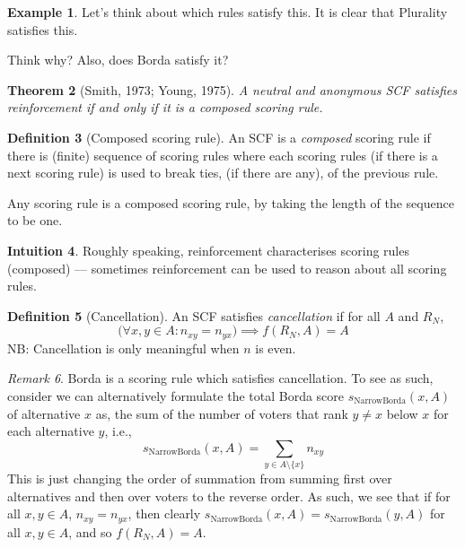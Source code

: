 \documentclass{book}
\newcommand{\unclear}[1]{%
  \par\noindent
  \colorbox{yellow!30}{#1}\par
}
\theoremstyle{plain}
\newtheorem{theorem}{Theorem}[subsection]
\theoremstyle{definition}
\newtheorem{definition}[theorem]{Definition}
\newtheorem{example}[theorem]{Example}
\newtheorem{intuition}[theorem]{Intuition}
\theoremstyle{remark}
\newtheorem{remark}[theorem]{Remark}
\begin{document}
\begin{example}
    Let's think about which rules satisfy this.
    It is clear that Plurality satisfies this.
    \unclear{Think why? Also, does Borda satisfy it?}
\end{example}

\begin{theorem}[Smith, 1973; Young, 1975]
    A neutral and 
    anonymous 
    SCF satisfies 
    reinforcement if and only if it is a \emph{composed} scoring rule.
\end{theorem}

\begin{definition}[Composed scoring rule]
    An SCF is a \emph{composed} scoring rule if there is 
    (finite) sequence 
    of scoring rules 
    where each scoring rules (if there is a next scoring rule) 
    is used to 
    break ties, 
    (if there are any), 
    of the previous rule.

    Any scoring rule is a 
    composed scoring rule,
    by taking the length of the sequence to be one.
\end{definition}

\begin{intuition}
    Roughly speaking, 
    reinforcement characterises 
    scoring rules (composed) --- sometimes 
    reinforcement can be used to reason about 
    all scoring rules.
\end{intuition}

\begin{definition}[Cancellation]
    An SCF satisfies \emph{cancellation} if for all $A$ and
    $R_N$, 
    \[
        \bigg( 
            \forall x, y \in A: n_{xy} = n_{yx}
        \bigg)
        \implies
        f(R_N, A) = A
    \]
    NB: Cancellation is only meaningful when $n$ is even.
\end{definition}

\begin{remark}
    Borda is a scoring rule which satisfies cancellation.
    To see as such, 
    consider we can alternatively formulate
    the total Borda score $s_{\text{NarrowBorda}}(x, A)$ 
    of alternative $x$ as, 
    the sum of the number of voters that 
    rank $y \neq x$ below $x$ for each alternative $y$, i.e., 
    \[
        s_{\text{NarrowBorda}}(x, A) = \sum_{y \in A \setminus \{x\}} n_{xy}
    \]
    This is just changing the order of summation from 
    summing first over alternatives and then over 
    voters to the reverse order.
    As such, we see that if 
    for all $x, y \in A$, $n_{xy} = n_{yx}$, then
    clearly 
    $s_{\text{NarrowBorda}}(x, A) = s_{\text{NarrowBorda}}(y, A)$ for all $x, y \in A$,
    and so 
    $f(R_N, A) = A$.
\end{remark}
\end{document}

